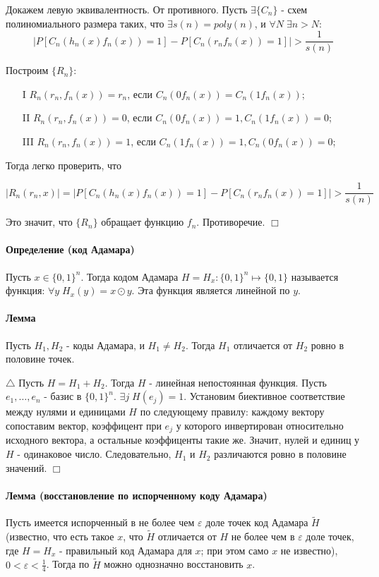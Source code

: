 \documentclass[12pt, a4paper]{article}
\newcommand{\bool}{\{0, 1\}}
\newcommand{\eps}{\varepsilon}
\begin{document}
Докажем левую эквивалентность. От противного. Пусть $\exists \{C_n\}$ - схем полиномиального размера таких, что $\exists s(n) = poly(n)$, и $\forall N \; \exists n > N$:
\[
 |P[C_n(h_n(x)f_n(x)) = 1] - P[C_n(r_n f_n(x)) = 1]| > \frac{1}{s(n)}
\]

Построим $\{R_n\}$:

\begin{itemize}
 \item[I] $R_n(r_n, f_n(x)) = r_n$, если $C_n(0 f_n(x)) = C_n(1 f_n(x))$;
 \item[II] $R_n(r_n, f_n(x)) = 0$, если $C_n(0 f_n(x)) = 1, C_n(1 f_n(x)) = 0$;
 \item[III] $R_n(r_n, f_n(x)) = 1$, если $C_n(1 f_n(x)) = 1, C_n(0 f_n(x)) = 0$;
\end{itemize}

Тогда легко проверить, что 

\[
 |R_n(r_n, x)| = |P[C_n(h_n(x)f_n(x)) = 1] - P[C_n(r_n f_n(x)) = 1]| > \frac{1}{s(n)}
\]

Это значит, что $\{R_n\}$ обращает функцию $f_n$. Противоречие. $\Box$

\paragraph{Определение (код Адамара)} Пусть $x \in \bool^n$. Тогда кодом Адамара $H = H_x : \bool^{n} \mapsto \bool$ называется функция: $\forall y \; H_x(y) = x \odot y$. Эта функция является линейной по $y$.

\paragraph{Лемма} Пусть $H_1, H_2$ - коды Адамара, и $H_1 \neq H_2$. Тогда $H_1$ отличается от $H_2$ ровно в половине точек.

$\triangle$ Пусть $H = H_1 + H_2$. Тогда $H$ - линейная непостоянная функция. Пусть $e_1, \dots, e_n$ - базис в $\bool^n$. $\exists j \; H(e_j) = 1$. Установим биективное соответствие между нулями и единицами $H$ по следующему правилу: каждому вектору сопоставим вектор, коэффицент при $e_j$ у которого инвертирован относительно исходного вектора, а остальные коэффиценты такие же. Значит, нулей и единиц у $H$ - одинаковое число. Следовательно, $H_1$ и $H_2$ различаются ровно в половине значений. $\Box$

\paragraph{Лемма (восстановление по испорченному коду Адамара)} Пусть имеется испорченный в не более чем $\eps$ доле точек код Адамара $\widetilde{H}$ (известно, что есть такое $x$, что $\widetilde{H}$ отличается от $H$ не более чем в $\eps$ доле точек, где $H = H_x$ - правильный код Адамара для $x$; при этом само $x$ не известно), $0 < \eps < \frac{1}{4}$. Тогда по $\widetilde{H}$ можно однозначно восстановить $x$.
\end{document}
